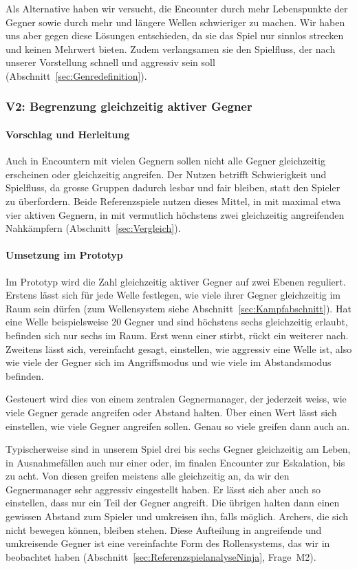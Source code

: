 \documentclass[../Main.tex]{subfiles}
\begin{document}
Als Alternative haben wir versucht, die Encounter durch mehr Lebenspunkte der Gegner sowie durch mehr und längere Wellen schwieriger zu machen. Wir haben uns aber gegen diese Lösungen entschieden, da sie das Spiel nur sinnlos strecken und keinen Mehrwert bieten. Zudem verlangsamen sie den Spielfluss, der nach unserer Vorstellung schnell und aggressiv sein soll (Abschnitt~\ref{sec:Genredefinition}).

\subsubsection{V2: Begrenzung gleichzeitig aktiver Gegner} \label{sec:V2}

\paragraph{Vorschlag und Herleitung}
Auch in Encountern mit vielen Gegnern sollen nicht alle Gegner gleichzeitig erscheinen oder gleichzeitig angreifen. Der Nutzen betrifft Schwierigkeit und Spielfluss, da grosse Gruppen dadurch lesbar und fair bleiben, statt den Spieler zu überfordern. Beide Referenzspiele nutzen dieses Mittel, in  mit maximal etwa vier aktiven Gegnern, in  mit vermutlich höchstens zwei gleichzeitig angreifenden Nahkämpfern (Abschnitt~\ref{sec:Vergleich}).

\paragraph{Umsetzung im Prototyp}
Im Prototyp wird die Zahl gleichzeitig aktiver Gegner auf zwei Ebenen reguliert. Erstens lässt sich für jede Welle festlegen, wie viele ihrer Gegner gleichzeitig im Raum sein dürfen (zum Wellensystem siehe Abschnitt~\ref{sec:Kampfabschnitt}). Hat eine Welle beispielsweise 20 Gegner und sind höchstens sechs gleichzeitig erlaubt, befinden sich nur sechs im Raum. Erst wenn einer stirbt, rückt ein weiterer nach. Zweitens lässt sich, vereinfacht gesagt, einstellen, wie aggressiv eine Welle ist, also wie viele der Gegner sich im Angriffsmodus und wie viele im Abstandsmodus befinden.

Gesteuert wird dies von einem zentralen Gegnermanager, der jederzeit weiss, wie viele Gegner gerade angreifen oder Abstand halten. Über einen Wert lässt sich einstellen, wie viele Gegner angreifen sollen. Genau so viele greifen dann auch an.

Typischerweise sind in unserem Spiel drei bis sechs Gegner gleichzeitig am Leben, in Ausnahmefällen auch nur einer oder, im finalen Encounter zur Eskalation, bis zu acht. Von diesen greifen meistens alle gleichzeitig an, da wir den Gegnermanager sehr aggressiv eingestellt haben. Er lässt sich aber auch so einstellen, dass nur ein Teil der Gegner angreift. Die übrigen halten dann einen gewissen Abstand zum Spieler und umkreisen ihn, falls möglich. Archers, die sich nicht bewegen können, bleiben stehen. Diese Aufteilung in angreifende und umkreisende Gegner ist eine vereinfachte Form des Rollensystems, das wir in  beobachtet haben (Abschnitt~\ref{sec:ReferenzspielanalyseNinja}, Frage~M2).
\end{document}
